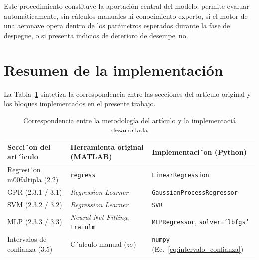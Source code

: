 Este procedimiento constituye la aportaci\'on central del modelo: permite evaluar autom\'aticamente, sin c\'alculos manuales ni conocimiento experto, si el motor de una aeronave opera dentro de los par\'ametros esperados durante la fase de despegue, o si presenta indicios de deterioro de desempe~no.

\section{Resumen de la implementaci\'on}

La Tabla~\ref{tab:resumen_implementacion} sintetiza la correspondencia entre las secciones del art\'iculo original y los bloques implementados en el presente trabajo.

\begin{table}[H]
\centering
\caption{Correspondencia entre la metodolog\'ia del art\'iculo y la implementaci\'a desarrollada}
\label{tab:resumen_implementacion}
\begin{tabular}{@{}p{3.8cm}p{3.8cm}p{5.6cm}@{}}
\toprule
\textbf{Secci´on del art´iculo} & \textbf{Herramienta original (MATLAB)} & \textbf{Implementaci´on (Python)} \\
\midrule
Regresi´on m\u00faltipla (2.2)     & \texttt{regress}                    & \texttt{LinearRegression} \\
GPR (2.3.1 / 3.1)            & \textit{Regression Learner}          & \texttt{GaussianProcessRegressor} \\
SVM (2.3.2 / 3.2)            & \textit{Regression Learner}          & \texttt{SVR} \\
MLP (2.3.3 / 3.3)            & \textit{Neural Net Fitting}, \texttt{trainlm} & \texttt{MLPRegressor}, \texttt{solver='lbfgs'} \\
Intervalos de confianza (3.5) & C´alculo manual ($z\sigma$)          & \texttt{numpy} (Ec.~\ref{eq:intervalo_confianza}) \\
\bottomrule
\end{tabular}
\end{table}
